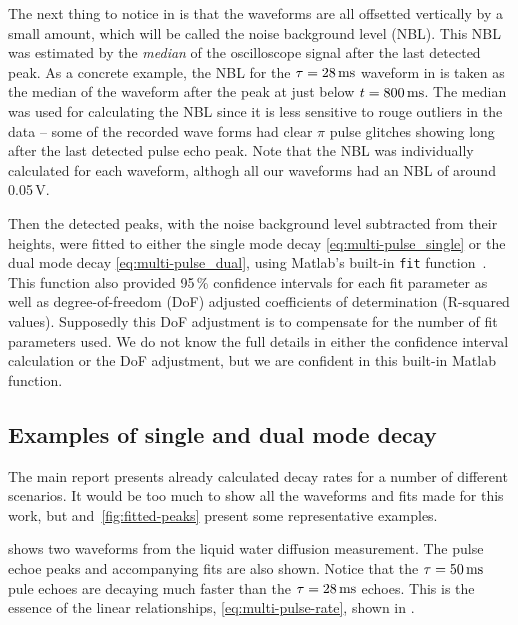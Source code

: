 \documentclass[11pt,a4paper, twocolumn,
swedish, english %
]{article}
\begin{document}
The next thing to notice in  is that the
waveforms are all offsetted vertically by a small amount, which will
be called the noise background level (NBL). This NBL was estimated by
the \emph{median} of the oscilloscope signal after the last detected
peak. As a concrete example, the NBL for the $\tau=\unit[28]{ms}$
waveform in  is taken as the median of the
waveform after the peak at just below $t=\unit[800]{ms}$. 
The median was used for calculating the NBL since it is less sensitive
to rouge outliers in the data -- some of the recorded wave forms had
clear $\pi$ pulse glitches showing long after the last detected pulse
echo peak. Note that the NBL was individually calculated for each
waveform, althogh all our waveforms had an NBL of around 0.05\,V. 

Then the detected peaks, with the noise background level subtracted
from their heights, were fitted to either the single mode decay
\eqref{eq:multi-pulse_single} or the dual mode decay
\eqref{eq:multi-pulse_dual}, using Matlab's built-in \texttt{fit}
function~\cite{Matlab-fit}. This function also provided 95\,\%
confidence intervals for each fit parameter as well as
degree-of-freedom (DoF) adjusted coefficients of determination (R-squared
values). Supposedly this DoF adjustment is to
compensate for the number of fit parameters used. We do not know the
full details in either the confidence interval calculation or the DoF
adjustment, but we are confident in this built-in Matlab function. 



\subsection{Examples of single and dual mode decay}
The main report presents already calculated decay rates for a number
of different scenarios. It would be too much to show all the waveforms
and fits made for this work\footnotemark{}, but 
and~\ref{fig:fitted-peaks} present some representative examples. 

 shows two waveforms from the liquid water
diffusion measurement. The pulse echoe peaks and accompanying fits are
also shown. Notice that the $\tau=\unit[50]{ms}$ pule echoes are
decaying much faster than the $\tau=\unit[28]{ms}$ echoes. This is the
essence of the linear relationships, \eqref{eq:multi-pulse-rate},
shown in . 
\end{document}
